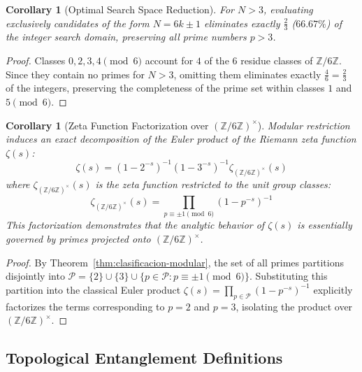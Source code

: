 \documentclass{article}
\numberwithin{equation}{section}
\newcommand{\ZZ}{\mathbb{Z}}
\theoremstyle{plain}
\newtheorem{corollary}[theorem]{Corollary}
\theoremstyle{definition}
\begin{document}
\begin{corollary}[Optimal Search Space Reduction]
\label{cor:reduccion-optima}
For $N > 3$, evaluating exclusively candidates of the form $N = 6k \pm 1$ eliminates exactly $\frac{2}{3}$ ($66.67\%$) of the integer search domain, preserving all prime numbers $p > 3$.
\end{corollary}

\begin{proof}
Classes $0, 2, 3, 4 \pmod{6}$ account for $4$ of the $6$ residue classes of $\ZZ/6\ZZ$. Since they contain no primes for $N > 3$, omitting them eliminates exactly $\frac{4}{6} = \frac{2}{3}$ of the integers, preserving the completeness of the prime set within classes $1$ and $5 \pmod{6}$.
\end{proof}

\begin{corollary}[Zeta Function Factorization over $(\ZZ/6\ZZ)^\times$]
\label{cor:implicaciones-zeta}
Modular restriction induces an exact decomposition of the Euler product of the Riemann zeta function $\zeta(s)$:
\begin{equation}
\zeta(s) = \left(1 - 2^{-s}\right)^{-1} \left(1 - 3^{-s}\right)^{-1} \zeta_{(\ZZ/6\ZZ)^\times}(s)
\end{equation}
where $\zeta_{(\ZZ/6\ZZ)^\times}(s)$ is the zeta function restricted to the unit group classes:
\begin{equation}
\zeta_{(\ZZ/6\ZZ)^\times}(s) = \prod_{p \equiv \pm 1 \pmod{6}} \left(1 - p^{-s}\right)^{-1}
\end{equation}
This factorization demonstrates that the analytic behavior of $\zeta(s)$ is essentially governed by primes projected onto $(\ZZ/6\ZZ)^\times$.
\end{corollary}

\begin{proof}
By Theorem~\ref{thm:clasificacion-modular}, the set of all primes partitions disjointly into $\mathcal{P} = \{2\} \cup \{3\} \cup \{p \in \mathcal{P} : p \equiv \pm 1 \pmod{6}\}$. Substituting this partition into the classical Euler product $\zeta(s) = \prod_{p \in \mathcal{P}} (1 - p^{-s})^{-1}$ explicitly factorizes the terms corresponding to $p=2$ and $p=3$, isolating the product over $(\ZZ/6\ZZ)^\times$.
\end{proof}

\subsection{Topological Entanglement Definitions}
\end{document}
